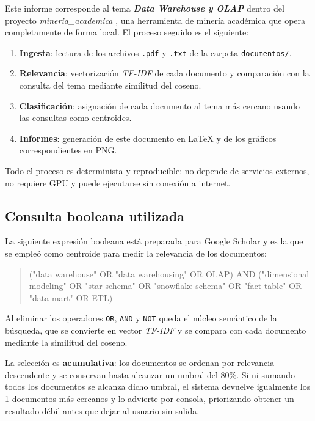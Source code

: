 \documentclass[11pt,a4paper]{article}
\newcommand{\tema}[1]{\textbf{\textit{#1}}}
\newcommand{\pcento}{\%}
\begin{document}
Este informe corresponde al tema \tema{ Data Warehouse y OLAP } dentro del
proyecto \textit{ mineria\_academica }, una herramienta de minería académica que
opera completamente de forma local. El proceso seguido es el siguiente:

\begin{enumerate}
  \item \textbf{Ingesta}: lectura de los archivos \texttt{.pdf} y
        \texttt{.txt} de la carpeta \texttt{documentos/}.
  \item \textbf{Relevancia}: vectorización \textit{TF-IDF} de cada documento
        y comparación con la consulta del tema mediante similitud del coseno.
  \item \textbf{Clasificación}: asignación de cada documento al tema más
        cercano usando las consultas como centroides.
  \item \textbf{Informes}: generación de este documento en \LaTeX{} y de los
        gráficos correspondientes en PNG.
\end{enumerate}

Todo el proceso es determinista y reproducible: no depende de servicios
externos, no requiere GPU y puede ejecutarse sin conexión a internet.

\subsection{Consulta booleana utilizada}
\label{sec:query}

La siguiente expresión booleana está preparada para Google Scholar y es la que
se empleó como centroide para medir la relevancia de los documentos:

\begin{quote}
\small\ttfamily
("data warehouse" OR "data warehousing" OR OLAP) AND ("dimensional modeling" OR "star schema" OR "snowflake schema" OR "fact table" OR "data mart" OR ETL)
\end{quote}

Al eliminar los operadores \texttt{OR}, \texttt{AND} y \texttt{NOT} queda el
núcleo semántico de la búsqueda, que se convierte en vector \textit{TF-IDF} y
se compara con cada documento mediante la similitud del coseno.

La selección es \textbf{acumulativa}: los documentos se ordenan por relevancia
descendente y se conservan hasta alcanzar un umbral del
80\pcento. Si ni sumando todos los documentos se alcanza
dicho umbral, el sistema devuelve igualmente los 1
documentos más cercanos y lo advierte por consola, priorizando obtener un
resultado débil antes que dejar al usuario sin salida.
\end{document}
